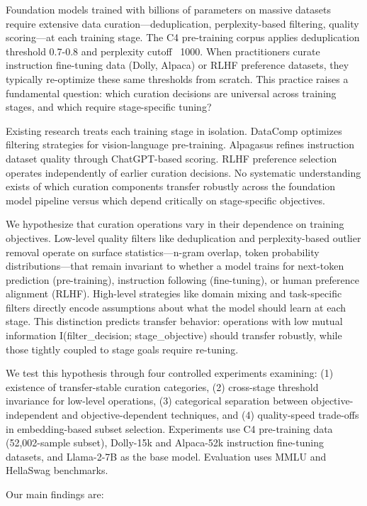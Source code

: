 
Foundation models trained with billions of parameters on massive datasets require extensive data curation---deduplication, perplexity-based filtering, quality scoring---at each training stage. The C4 pre-training corpus applies deduplication threshold 0.7-0.8 and perplexity cutoff ~1000. When practitioners curate instruction fine-tuning data (Dolly, Alpaca) or RLHF preference datasets, they typically re-optimize these same thresholds from scratch. This practice raises a fundamental question: which curation decisions are universal across training stages, and which require stage-specific tuning?

Existing research treats each training stage in isolation. DataComp optimizes filtering strategies for vision-language pre-training. Alpagasus refines instruction dataset quality through ChatGPT-based scoring. RLHF preference selection operates independently of earlier curation decisions. No systematic understanding exists of which curation components transfer robustly across the foundation model pipeline versus which depend critically on stage-specific objectives.

We hypothesize that curation operations vary in their dependence on training objectives. Low-level quality filters like deduplication and perplexity-based outlier removal operate on surface statistics---n-gram overlap, token probability distributions---that remain invariant to whether a model trains for next-token prediction (pre-training), instruction following (fine-tuning), or human preference alignment (RLHF). High-level strategies like domain mixing and task-specific filters directly encode assumptions about what the model should learn at each stage. This distinction predicts transfer behavior: operations with low mutual information I(filter\_decision; stage\_objective) should transfer robustly, while those tightly coupled to stage goals require re-tuning.

We test this hypothesis through four controlled experiments examining: (1) existence of transfer-stable curation categories, (2) cross-stage threshold invariance for low-level operations, (3) categorical separation between objective-independent and objective-dependent techniques, and (4) quality-speed trade-offs in embedding-based subset selection. Experiments use C4 pre-training data (52,002-sample subset), Dolly-15k and Alpaca-52k instruction fine-tuning datasets, and Llama-2-7B as the base model. Evaluation uses MMLU and HellaSwag benchmarks.

Our main findings are:

